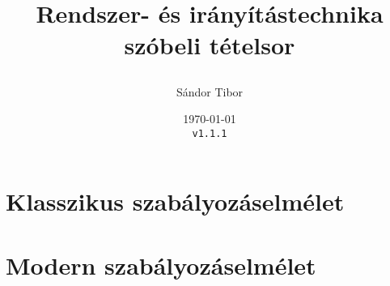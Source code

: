 \documentclass[a4paper,twoside,listof=totoc]{scrbook}
\title{
  Rendszer- és irányítástechnika \\
  szóbeli tételsor

}
\author{Sándor Tibor}
\date{
  \today \\
  \texttt{v1.1.1} \\
}
\numberwithin{equation}{section}
\begin{document}


\tableofcontents
\begingroup
\vfill
\let\cleardoublepage\relax
\listoffigures
\endgroup


\chapter{Klasszikus szabályozáselmélet}









\chapter{Modern szabályozáselmélet}

\setcounter{section}{7}









\end{document}
